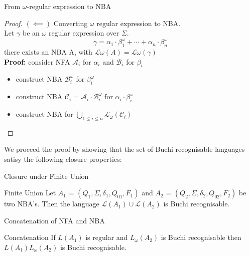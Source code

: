 \documentclass[14pts]{beamer}
\begin{document}
    \begin{frame}{From $\omega$-regular expression to NBA}
      \begin{proof}
      $(\impliedby)$ Converting $\omega$ regular expression to NBA.\\
      Let $\gamma$ be an $\omega$ regular expression over $\Sigma$.\\
      \[\gamma = \alpha_1\cdot\beta_1^{\omega} + \cdots + \alpha_n\cdot\beta_n^{\omega}\]
      there exists an NBA A, with $\mathcal{L}{\omega}(A) = \mathcal{L}{\omega}(\gamma)$\\
      \textbf<overlay specification>{Proof:} consider NFA $\mathcal{A}_i$ for $\alpha_i$ and $\mathcal{B}_i$ for $\beta_i$\\
        \begin{itemize}
            \item construct NBA $\mathcal{B}_i^{\omega} $ for $\beta_i^{\omega}$
            \item construct NBA $\mathcal{C}_i = \mathcal{A}_i\cdot\mathcal{B}_i^{\omega}$ for $\alpha_i\cdot\beta_i^{\omega}$
            \item construct NBA for $\bigcup_{1\leq i \leq n}\mathcal{L}_{\omega}(\mathcal{C}_i)$
        \end{itemize}
        \end{proof}
        We proceed the proof by showing that the set of Buchi recognisable languages satisy the following closure properties:
    \end{frame}
    \begin{frame}{Closure under Finite Union}
        \begin{block}{Finite Union}
            Let $A_1$ = $(Q_1, \Sigma, \delta_1, Q_{01}, F_1)$ and $A_2$ = $(Q_2, \Sigma, \delta_2, Q_{02}, F_2)$ be two NBA's. Then the language $\mathcal{L}(A_1) \cup \mathcal{L}(A_2)$ is Buchi recognisable.
        \end{block}
    \end{frame}
    \begin{frame}{Concatenation of NFA and NBA }
    \begin{block}{Concatenation}  
      If $L(A_1)$ is regular and $L_{\omega}(A_2)$ is Buchi recognisable then $L(A_1)L_{\omega}(A_2)$ is Buchi recognisable.
    \end{block}
    \end{frame}
\end{document}

